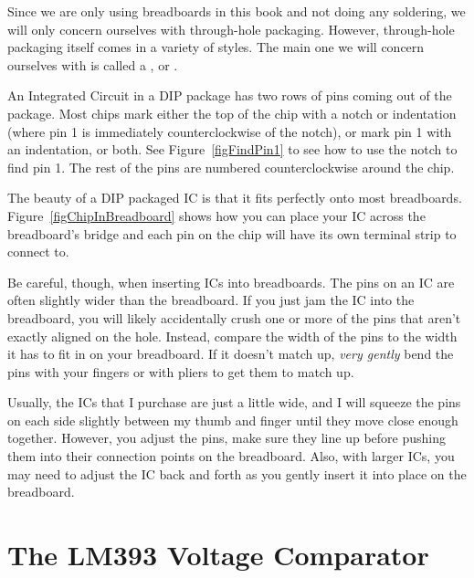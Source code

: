 
Since we are only using breadboards in this book and not doing any soldering, we will only concern ourselves with through-hole packaging.
However, through-hole packaging itself comes in a variety of styles.
The main one we will concern ourselves with is called a , or .  


An Integrated Circuit in a DIP package has two rows of pins coming out of the package.
Most chips mark either the top of the chip with a notch or indentation (where pin 1 is immediately counterclockwise of the notch), or mark pin 1 with an indentation, or both. 
See Figure~\ref{figFindPin1} to see how to use the notch to find pin 1.
The rest of the pins are numbered counterclockwise around the chip.


The beauty of a DIP packaged IC is that it fits perfectly onto most breadboards.
Figure~\ref{figChipInBreadboard} shows how you can place your IC across the breadboard's bridge and each pin on the chip will have its own terminal strip to connect to.

Be careful, though, when inserting ICs into breadboards.
The pins on an IC are often slightly wider than the breadboard.
If you just jam the IC into the breadboard, you will likely accidentally crush one or more of the pins that aren't exactly aligned on the hole.
Instead, compare the width of the pins to the width it has to fit in on your breadboard.
If it doesn't match up, \emph{very gently} bend the pins with your fingers or with pliers to get them to match up.

Usually, the ICs that I purchase are just a little wide, and I will squeeze the pins on each side slightly between my thumb and finger until they move close enough together.
However, you adjust the pins, make sure they line up before pushing them into their connection points on the breadboard.
Also, with larger ICs, you may need to adjust the IC back and forth as you gently insert it into place on the breadboard.

\section{The LM393 Voltage Comparator}

